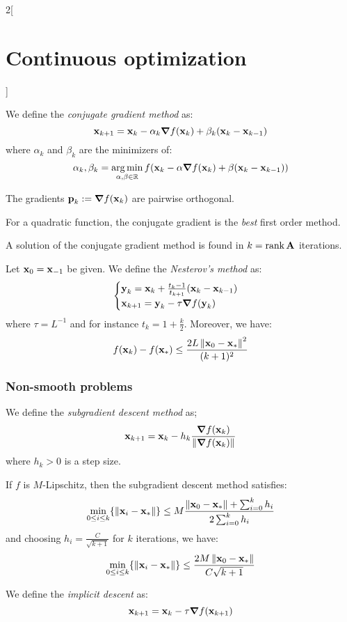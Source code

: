 \documentclass[../../../main_math.tex]{subfiles}
\begin{document}
\begin{multicols}{2}[\section{Continuous optimization}]
\begin{definition}
    We define the \emph{conjugate gradient method} as:
    \begin{equation*}
      \boldsymbol{\mathrm{x}}_{k+1}=\boldsymbol{\mathrm{x}}_k-\alpha_k \grad f(\boldsymbol{\mathrm{x}}_k)+\beta_k(\boldsymbol{\mathrm{x}}_k-\boldsymbol{\mathrm{x}}_{k-1})
    \end{equation*}
    where $\alpha_k$ and $\beta_k$ are the minimizers of:
    $$
      \alpha_k,\beta_k=\operatorname*{arg\,min}_{\alpha,\beta\in\mathbb{R}} f(\boldsymbol{\mathrm{x}}_k-\alpha \grad f(\boldsymbol{\mathrm{x}}_k)+\beta(\boldsymbol{\mathrm{x}}_k-\boldsymbol{\mathrm{x}}_{k-1}))
    $$
  \end{definition}
  \begin{lemma}
    The gradients $\boldsymbol{\mathrm{p}}_k:=\grad f(\boldsymbol{\mathrm{x}}_k)$ are pairwise orthogonal.
  \end{lemma}
  \begin{corollary}
    For a quadratic function, the conjugate gradient is the \textit{best} first order method.
  \end{corollary}
  \begin{corollary}
    A solution of the conjugate gradient method is found in $k=\rank \boldsymbol{\mathrm{A}}$ iterations.
  \end{corollary}
  \begin{definition}
    Let $\boldsymbol{\mathrm{x}}_0=\boldsymbol{\mathrm{x}}_{-1}$ be given. We define the \emph{Nesterov's method} as:
    $$
      \begin{cases}
        \boldsymbol{\mathrm{y}}_k=\boldsymbol{\mathrm{x}}_k+\frac{t_k-1}{t_{k+1}}(\boldsymbol{\mathrm{x}}_k-\boldsymbol{\mathrm{x}}_{k-1}) \\
        \boldsymbol{\mathrm{x}}_{k+1}=\boldsymbol{\mathrm{y}}_k-\tau \grad f(\boldsymbol{\mathrm{y}}_k)
      \end{cases}
    $$
    where $\tau=L^{-1}$ and for instance $t_k=1+\frac{k}{2}$. Moreover, we have:
    $$
      f(\boldsymbol{\mathrm{x}}_k)-f(\boldsymbol{\mathrm{x}}_*)\leq \frac{2L\left\|\boldsymbol{\mathrm{x}}_0-\boldsymbol{\mathrm{x}}_*\right\|^2}{(k+1)^2}
    $$
  \end{definition}
  \subsubsection{Non-smooth problems}
  \begin{definition}
    We define the \emph{subgradient descent method} as;
    $$
      \boldsymbol{\mathrm{x}}_{k+1}=\boldsymbol{\mathrm{x}}_k-h_k\frac{\grad f(\boldsymbol{\mathrm{x}}_k)}{\left\|\grad f(\boldsymbol{\mathrm{x}}_k)\right\|}
    $$
    where $h_k>0$ is a step size.
  \end{definition}
  \begin{proposition}
    If $f$ is $M$-Lipschitz, then the subgradient descent method satisfies:
    $$
      \min_{0\leq i\leq k} \{ \left\|\boldsymbol{\mathrm{x}}_i-\boldsymbol{\mathrm{x}}_*\right\| \}\leq M\frac{\left\|\boldsymbol{\mathrm{x}}_0-\boldsymbol{\mathrm{x}}_*\right\| + \sum_{i=0}^k h_i}{2\sum_{i=0}^k h_i}
    $$
    and choosing $h_i=\frac{C}{\sqrt{k+1}}$ for $k$ iterations, we have:
    $$
      \min_{0\leq i\leq k} \{ \left\|\boldsymbol{\mathrm{x}}_i-\boldsymbol{\mathrm{x}}_*\right\| \}\leq \frac{2M\left\|\boldsymbol{\mathrm{x}}_0-\boldsymbol{\mathrm{x}}_*\right\|}{C\sqrt{k+1}}
    $$
  \end{proposition}
  \begin{definition}
    We define the \emph{implicit descent} as:
    $$
      \boldsymbol{\mathrm{x}}_{k+1}=\boldsymbol{\mathrm{x}}_k-\tau \grad f(\boldsymbol{\mathrm{x}}_{k+1})
    $$
  \end{definition}

\end{multicols}
\end{document}
